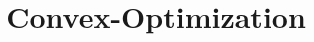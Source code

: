 \documentclass[journal,12pt,twocolumn]{IEEEtran}
\begin{document}
\let\StandardTheFigure\thefigure
\let\vec\mathbf
\renewcommand{\thefigure}{\theproblem}



\def\putbox#1#2#3{\makebox[0in][l]{\makebox[#1][l]{}\raisebox{\baselineskip}[0in][0in]{\raisebox{#2}[0in][0in]{#3}}}}
     \def\rightbox#1{\makebox[0in][r]{#1}}
     \def\centbox#1{\makebox[0in]{#1}}
     \def\topbox#1{\raisebox{-\baselineskip}[0in][0in]{#1}}
     \def\midbox#1{\raisebox{-0.5\baselineskip}[0in][0in]{#1}}

\title{Convex-Optimization}
\maketitle
\end{document}
